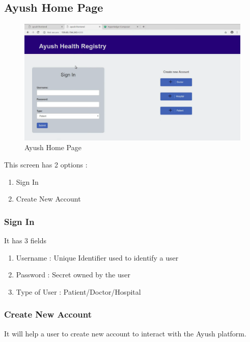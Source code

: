 \documentclass[11pt]{report}
\begin{document}
   \subsection{Ayush Home Page}
            \begin{figure}[h!]
        \centering
        \includegraphics[scale=0.3]{proto1.png}
        \caption{Ayush Home Page}
        \label{fig:my_label}
    \end{figure}
    This screen has 2 options :
    \begin{enumerate}
        \item Sign In
        \item Create New Account
    \end{enumerate}
    \subsubsection{Sign In}
    It has 3 fields
    \begin{enumerate}
        \item Username : Unique Identifier used to identify a user
        \item Password : Secret owned by the user
        \item Type of User : Patient/Doctor/Hospital
    \end{enumerate}
    
    \subsubsection{Create New Account}
    It will help a user to create new account to interact with the Ayush platform.
    
   \newpage 
\end{document}

